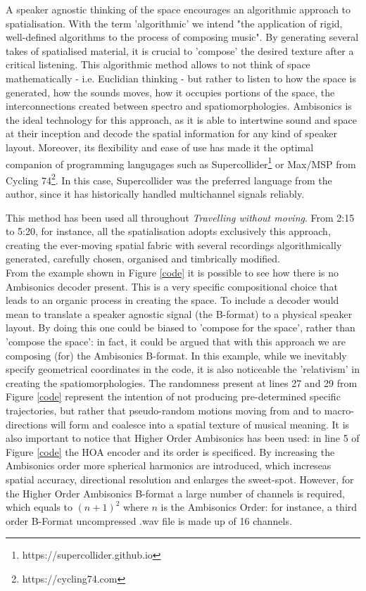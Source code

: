 \documentclass{article}
\begin{document}
        A speaker agnostic thinking of the space encourages an algorithmic approach to spatialisation. With the term 'algorithmic' we intend "the application of rigid, well-defined algorithms to the process of composing music"\cite{Jacob1996}. By generating several takes of spatialised material, it is crucial to 'compose' the desired texture after a critical listening. This algorithmic method allows to not think of space mathematically - i.e. Euclidian thinking - but rather to listen to how the space is generated, how the sounds moves, how it occupies portions of the space, the interconnections created between spectro and spatiomorphologies. Ambisonics is the ideal technology for this approach, as it is able to intertwine sound and space at their inception and decode the spatial information for any kind of speaker layout. Moreover, its flexibility and ease of use has made it the optimal companion of programming langugages such as Supercollider\footnote{https://supercollider.github.io} or Max/MSP from Cycling 74\footnote{https://cycling74.com}. In this case, Supercollider was the preferred language from the author, since it has historically handled multichannel signals reliably.

        This method has been used all throughout \textit{Travelling without moving}. From 2:15 to 5:20, for instance, all the spatialisation adopts exclusively this approach, creating the ever-moving spatial fabric with several recordings algorithmically generated, carefully chosen, organised and timbrically modified. \\
        From the example shown in Figure \ref{code} it is possible to see how there is no Ambisonics decoder present. This is a very specific compositional choice that leads to an organic process in creating the space. To include a decoder would mean to translate a speaker agnostic signal (the B-format) to a physical speaker layout. By doing this one could be biased to 'compose for the space', rather than 'compose the space': in fact, it could be argued that with this approach we are composing (for) the Ambisonics B-format. In this example, while we inevitably specify geometrical coordinates in the code, it is also noticeable the 'relativism' in creating the spatiomorphologies. The randomness present at lines 27 and 29 from Figure \ref{code} represent the intention of not producing pre-determined specific trajectories, but rather that pseudo-random motions moving from and to macro-directions will form and coalesce into a spatial texture of musical meaning. It is also important to notice that Higher Order Ambisonics has been used: in line 5 of Figure \ref{code} the HOA encoder and its order is specificed. By increasing the Ambisonics order more spherical harmonics are introduced, which increseas spatial accuracy, directional resolution and enlarges the sweet-spot\cite{Zotter2019}. However, for the Higher Order Ambisonics B-format a large number of channels is required, which equals to $(n+1)^2$ where $n$ is the Ambisonics Order: for instance, a third order B-Format uncompressed .wav file is made up of 16 channels.
\end{document}
